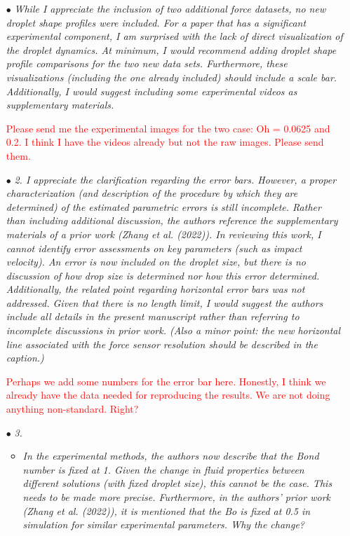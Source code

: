 \documentclass[]{article}
\newcommand*\red{\textcolor{red}}
\begin{document}
\begin{enumerate}
	\item[$\bullet$] \textit{While I appreciate the inclusion of two additional force datasets, no new droplet shape profiles were included. For a paper that has a significant experimental component, I am surprised with the lack of direct visualization of the droplet dynamics. At minimum, I would recommend adding droplet shape profile comparisons for the two new data sets. Furthermore, these visualizations (including the one already included) should include a scale bar. Additionally, I would suggest including some experimental videos as supplementary materials.}
	
	\red{Please send me the experimental images for the two case: Oh = 0.0625 and 0.2. I think I have the videos already but not the raw images. Please send them.}
	
	\item[$\bullet$] \textit{2. I appreciate the clarification regarding the error bars. However, a proper characterization (and description of the procedure by which they are determined) of the estimated parametric errors is still incomplete. Rather than including additional discussion, the authors reference the supplementary materials of a prior work (Zhang et al. (2022)). In reviewing this work, I cannot identify error assessments on key parameters (such as impact velocity). An error is now included on the droplet size, but there is no discussion of how drop size is determined nor how this error determined. Additionally, the related point regarding horizontal error bars was not addressed. Given that there is no length limit, I would suggest the authors include all details in the present manuscript rather than referring to incomplete discussions in prior work. (Also a minor point: the new horizontal line associated with the force sensor resolution should be described in the caption.)}
	
	\red{Perhaps we add some numbers for the error bar here. Honestly, I think we already have the data needed for reproducing the results. We are not doing anything non-standard. Right?}
	
	\item[$\bullet$] \textit{3.}
	\begin{itemize}
		\renewcommand\labelitemi{--}
		\item \textit{In the experimental methods, the authors now describe that the Bond number is fixed at 1. Given the change in fluid properties between different solutions (with fixed droplet size), this cannot be the case. This needs to be made more precise. Furthermore, in the authors' prior work (Zhang et al. (2022)), it is mentioned that the Bo is fixed at 0.5 in simulation for similar experimental parameters. Why the change?}
		

\end{itemize}
\end{enumerate}
\end{document}

